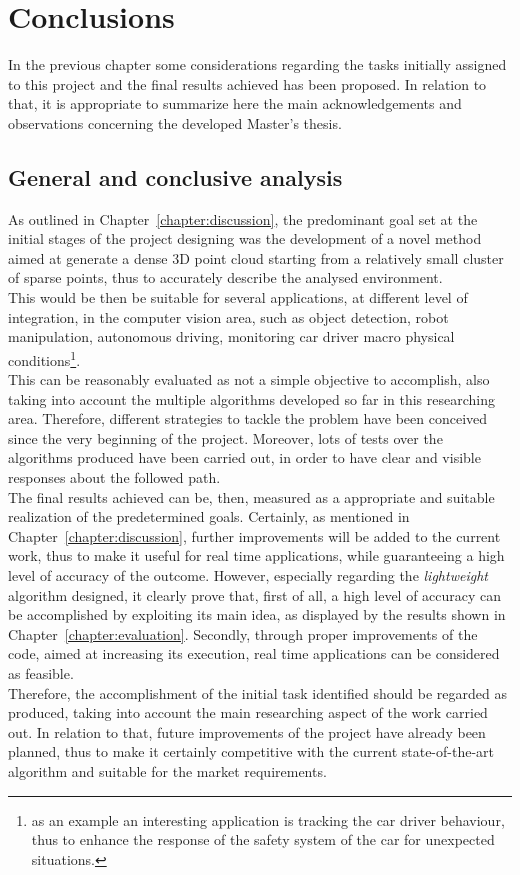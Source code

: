 \chapter{Conclusions}
\label{chapter:conclusions}

In the previous chapter some considerations regarding the tasks initially assigned to this project and the final results achieved has been proposed.
In relation to that, it is appropriate to summarize here the main acknowledgements and observations concerning the developed Master's thesis.

\section{General and conclusive analysis}
\label{section:general-final-analysis}

As outlined in Chapter~\ref{chapter:discussion}, the predominant goal set at  the initial stages of the project designing was the development of a novel method aimed at generate a dense 3D point cloud starting from a relatively small cluster of sparse points, thus to accurately describe the analysed environment.\\
This would be then be suitable for several applications, at different level of integration, in the computer vision area, such as object detection, robot manipulation, autonomous driving, monitoring car driver macro physical conditions\footnote{as an example an interesting application is tracking the car driver behaviour, thus to enhance the response of the safety system of the car for unexpected situations.}.\\
This can be reasonably evaluated as not a simple objective to accomplish, also taking into account the multiple algorithms developed so far in this researching area.
Therefore, different strategies to tackle the problem have been conceived since the very beginning of the project. 
Moreover, lots of tests over the algorithms produced have been carried out, in order to have clear and visible responses about the followed path.\\
The final results achieved can be, then, measured as a appropriate and suitable realization of the predetermined goals.
Certainly, as mentioned in Chapter~\ref{chapter:discussion}, further improvements will be added to the current work, thus to make it useful for real time applications, while guaranteeing a high level of accuracy of the outcome.
However, especially regarding the \textit{lightweight} algorithm designed, it clearly prove that, first of all, a high level of accuracy can be accomplished by exploiting its main idea, as displayed by the results shown in Chapter~\ref{chapter:evaluation}.
Secondly, through proper improvements of the code, aimed at increasing its execution, real time applications can be considered as feasible.\\
Therefore, the accomplishment of the initial task identified should be regarded as produced, taking into account the main researching aspect of the work carried out.
In relation to that, future improvements of the project have already been planned, thus to make it certainly competitive with the current state-of-the-art algorithm and suitable for the market requirements.

